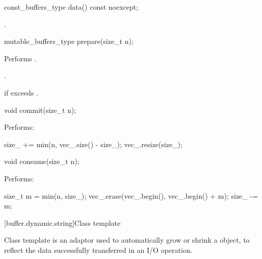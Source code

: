\begin{itemdecl}
const_buffers_type data() const noexcept;
\end{itemdecl}

\begin{itemdescr}
\pnum
\returns {}.
\end{itemdescr}

\begin{itemdecl}
mutable_buffers_type prepare(size_t n);
\end{itemdecl}

\begin{itemdescr}
\pnum
\effects Performs .

\pnum
\returns {}.

\pnum
\remarks {} if  exceeds .
\end{itemdescr}

\begin{itemdecl}
void commit(size_t n);
\end{itemdecl}

\begin{itemdescr}
\pnum
\effects Performs:
\begin{codeblock}
size_ += min(n, vec_.size() - size_);
vec_.resize(size_);
\end{codeblock}

\end{itemdescr}

\begin{itemdecl}
void consume(size_t n);
\end{itemdecl}

\begin{itemdescr}
\pnum
\effects Performs:
\begin{codeblock}
size_t m = min(n, size_);
vec_.erase(vec_.begin(), vec_.begin() + m);
size_ -= m;
\end{codeblock}

\end{itemdescr}



[buffer.dynamic.string]{Class template }

\pnum
Class template  is an adaptor used to automatically grow or shrink a  object, to reflect the data successfully transferred in an I/O operation.

